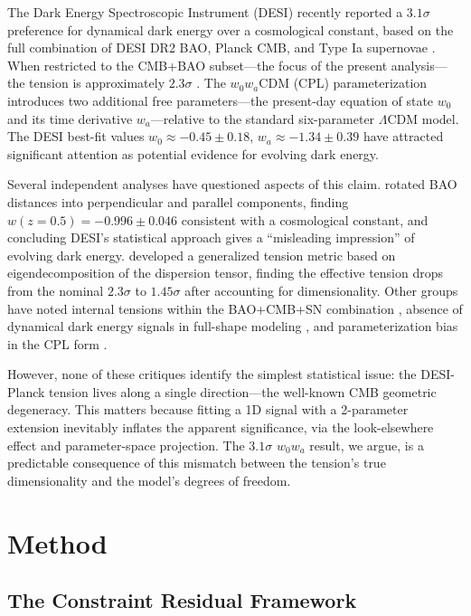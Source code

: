 \documentclass[12pt,preprint]{aastex631}
\begin{document}
The Dark Energy Spectroscopic Instrument (DESI) recently reported a $3.1\sigma$ preference for dynamical dark energy over a cosmological constant, based on the full combination of DESI DR2 BAO, Planck CMB, and Type Ia supernovae \citep{desi2025dr2}. When restricted to the CMB+BAO subset---the focus of the present analysis---the tension is approximately $2.3\sigma$ \citep{leizerovich2025}. The $w_0 w_a$CDM (CPL) parameterization \citep{chevallier2001, linder2003} introduces two additional free parameters---the present-day equation of state $w_0$ and its time derivative $w_a$---relative to the standard six-parameter $\Lambda$CDM model. The DESI best-fit values $w_0 \approx -0.45 \pm 0.18$, $w_a \approx -1.34 \pm 0.39$ have attracted significant attention as potential evidence for evolving dark energy.

Several independent analyses have questioned aspects of this claim. \citet{efstathiou2025} rotated BAO distances into perpendicular and parallel components, finding $w(z=0.5) = -0.996 \pm 0.046$ consistent with a cosmological constant, and concluding DESI's statistical approach gives a ``misleading impression'' of evolving dark energy. \citet{leizerovich2025} developed a generalized tension metric based on eigendecomposition of the dispersion tensor, finding the effective tension drops from the nominal $2.3\sigma$ to $1.45\sigma$ after accounting for dimensionality. Other groups have noted internal tensions within the BAO+CMB+SN combination \citep{wang2025epjc}, absence of dynamical dark energy signals in full-shape modeling \citep{oc4}, and parameterization bias in the CPL form \citep{dinda2025, lee2025}.

However, none of these critiques identify the simplest statistical issue: the DESI-Planck tension lives along a single direction---the well-known CMB geometric degeneracy. This matters because fitting a 1D signal with a 2-parameter extension inevitably inflates the apparent significance, via the look-elsewhere effect and parameter-space projection. The $3.1\sigma$ $w_0 w_a$ result, we argue, is a predictable consequence of this mismatch between the tension's true dimensionality and the model's degrees of freedom.

\section{Method}
\label{sec:method}

\subsection{The Constraint Residual Framework}
\end{document}
